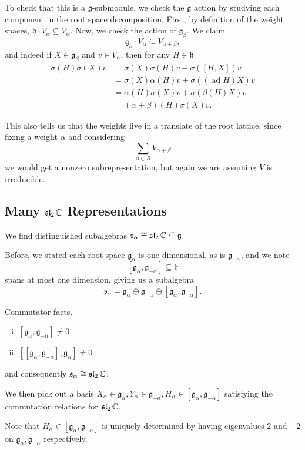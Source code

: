 \documentclass[12pt]{article}
\newcommand{\fg}{\mathfrak{g}}
\newcommand{\fh}{\mathfrak{h}}
\newcommand{\fs}{\mathfrak{s}}
\DeclareMathOperator{\ad}{ad}
\newcommand{\fsl}{\operatorname{\mathfrak{sl}}}
\begin{document}
To check that this is a $\fg$-submodule, we check the $\fg$ action by studying each component in the root space decomposition. First, by definition of the weight spaces, $\fh \cdot V_\alpha \subseteq V_\alpha$. Now, we check the action of $\fg_\beta$. We claim
\[\fg_\beta \cdot V_\alpha \subseteq V_{\alpha+\beta},\]
and indeed if $X\in \fg_\beta$ and $v\in V_\alpha$, then for any $H\in \fh$
\begin{align*}
    \sigma(H)\sigma(X)v &= \sigma(X)\sigma(H)v + \sigma([H,X])v\\
    &= \sigma(X)\alpha(H)v + \sigma((\ad H)X)v\\
    &= \alpha(H)\sigma(X)v + \sigma(\beta(H)X)v\\
    &= (\alpha + \beta)(H)\sigma(X)v.
\end{align*}

This also tells us that the weights live in a translate of the root lattice, since fixing a weight $\alpha$ and considering
\[\sum_{\beta\in R} V_{\alpha+\beta}\]
we would get a nonzero subrepresentation, but again we are assuming $V$ is irreducible.

\subsection{Many $\fsl_2\C$ Representations}

We find distinguished subalgebras $\fs_\alpha \cong \fsl_2 \C \subseteq \fg$.

Before, we stated each root space $\fg_\alpha$ is one dimensional, as is $\fg_{-\alpha}$, and we note
\[[\fg_\alpha,\fg_{-\alpha}] \subseteq \fh\]
spans at most one dimension, giving us a subalgebra
\[\fs_\alpha = \fg_\alpha \oplus \fg_{-\alpha} \oplus [\fg_\alpha, \fg_{-\alpha}].\]

\begin{prop}
    Commutator facts.
    \begin{enumerate}[(i)]
        \item $[\fg_\alpha,\fg_{-\alpha}] \neq 0$
        \item $[[\fg_\alpha,\fg_{-\alpha}],\fg_\alpha] \neq 0$
    \end{enumerate}
    and consequently $\fs_\alpha \cong \fsl_2\C$.
\end{prop}

We then pick out a basis $X_\alpha\in \fg_\alpha, Y_\alpha\in \fg_{-\alpha}, H_\alpha \in [\fg_\alpha,\fg_{-\alpha}]$ satisfying the commutation relations for $\fsl_2\C$.

Note that $H_\alpha\in [\fg_\alpha,\fg_{-\alpha}]$ is uniquely determined by having eigenvalues $2$ and $-2$ on $\fg_\alpha,\fg_{-\alpha}$ respectively.
\end{document}
